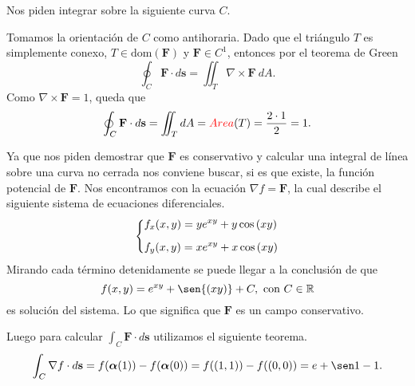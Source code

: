 
\begin{solution}
    Nos piden integrar sobre la siguiente curva $C$.

    \begin{center}
    \end{center}

    Tomamos la orientaci\'on de $C$ como antihoraria.
    Dado que el tri\'angulo $T$  es simplemente conexo,   $T
        \in \text{dom}(\mathbf{F})$ y $\mathbf{F}\in C^1$, entonces
    por el teorema de Green
    \[
        \oint_C \mathbf{F}\cdot d\mathbf{s} = \iint_T
        \nabla\times\mathbf{F}\:dA.
    \]
    Como $\nabla\times\mathbf{F} = 1$, queda que \[\oint_C
        \mathbf{F}\cdot d\mathbf{s} = \iint_T dA = \textcolor{red}{Area}(T)
        = \frac{2\cdot1}{2} = 1.\]
\end{solution}


\begin{solution}
    Ya que nos piden demostrar que $\mathbf{F}$ es conservativo
    y calcular una integral de l\'inea sobre una curva no
    cerrada nos conviene buscar, si es que existe, la funci\'on
    potencial de $\mathbf{F}$. Nos encontramos con la ecuaci\'on
    $\nabla f = \mathbf{F}$, la cual describe el siguiente
    sistema de ecuaciones diferenciales.
    \[
        \begin{dcases}
            f_x(x,y) = ye^{xy} + y \cos{(xy)} \\[.2cm]
            f_y(x,y) = xe^{xy} + x \cos{(xy)}
        \end{dcases}
    \]
    Mirando cada t\'ermino detenidamente se puede llegar a
    la conclusi\'on de que $$f(x,y) = e^{xy} + \sen{(xy)} + C,
        \mbox{ con } C\in\Re$$ es soluci\'on del sistema. Lo que
    significa que $\mathbf{F}$ es un campo conservativo.

    Luego para calcular $\int_C \mathbf{F}\cdot d\mathbf{s}$
    utilizamos el siguiente teorema.
    \[
        \int_C \nabla f\cdot d\mathbf{s} =
        f(\boldsymbol{\alpha}(1)) - f(\boldsymbol{\alpha}(0)) =
        f((1,1)) - f((0,0)) = e + \sen1 - 1.
    \]
\end{solution}


